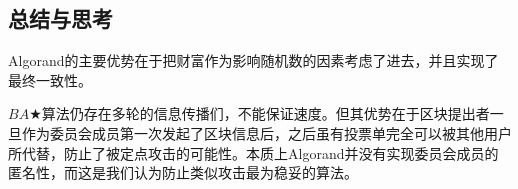\subsection{总结与思考}
Algorand的主要优势在于把财富作为影响随机数的因素考虑了进去，并且实现了最终一致性。

$BA\bigstar$算法仍存在多轮的信息传播们，不能保证速度。但其优势在于区块提出者一旦作为委员会成员第一次发起了区块信息后，之后虽有投票单完全可以被其他用户所代替，防止了被定点攻击的可能性。本质上Algorand并没有实现委员会成员的匿名性，而这是我们认为防止类似攻击最为稳妥的算法。
     
    
     

